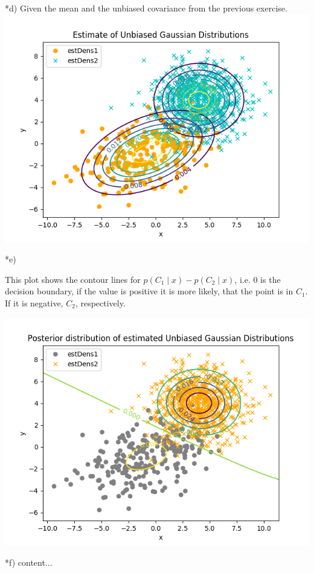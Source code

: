 \documentclass[12pt]{article}
\begin{document}
\begin{section}
\begin{subsection}
	\end{subsection}
	\newpage
	\begin{subsection}*{d)}
		Given the mean and the unbiased covariance from the previous exercise.\\
		\includegraphics[scale=.7]{./Estimate.png}
	\end{subsection}
	\newpage
	\begin{subsection}*{e)}
		
		
		
		
		This plot shows the contour lines for $p(C_1\mid x)- p(C_2\mid x)$, i.e. 0 is the decision boundary, if the value is positive it is more likely, that the point is in $C_1$.
		If it is negative, $C_2$, respectively.
		
		\includegraphics[scale=.7]{./Posterior.png}
	\end{subsection}
	
	\begin{subsection}*{f)}
		content...
	\end{subsection}
\end{section}
\end{document}
